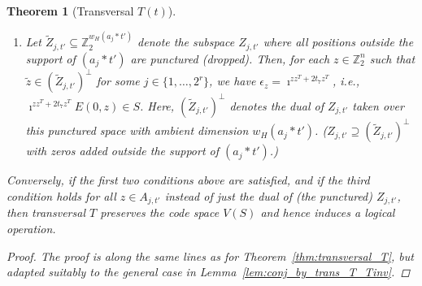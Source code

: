 \documentclass[twoside,romanappendices]{IEEEtran}
\newtheorem{theorem}{Theorem}
\newcommand{\llbr}{[\![}
\newcommand{\rrbr}{]\!]}
\begin{document}
\begin{theorem}[Transversal $T(t)$]
\begin{enumerate}
\item Let $\tilde{Z}_{j,t'} \subseteq \mathbb{Z}_2^{w_H(a_j \ast t')}$ denote the subspace $Z_{j,t'}$ where all positions outside the support of $(a_j \ast t')$ are punctured (dropped).
      Then, for each $z \in \mathbb{Z}_2^n$ such that $\tilde{z} \in (\tilde{Z}_{j,t'})^{\perp}$ for some $j \in \{ 1,\ldots,2^r \}$, we have $\epsilon_z = \imath^{zz^T + 2t_7 z^T}$, i.e., $\imath^{zz^T + 2t_7 z^T} E(0,z) \in S$.
      Here, $(\tilde{Z}_{j,t'})^{\perp}$ denotes the dual of $Z_{j,t'}$ taken over this punctured space with ambient dimension $w_H(a_j \ast t')$.
      ($Z_{j,t'} \supseteq (\tilde{Z}_{j,t'})^{\perp}$ with zeros added outside the support of $(a_j \ast t')$.)

\end{enumerate} 
Conversely, if the first two conditions above are satisfied, and if the third condition holds for all $z \in A_{j,t'}$ instead of just the dual of (the punctured) $Z_{j,t'}$, then transversal $T$ preserves the code space $V(S)$ and hence induces a logical operation.
\begin{proof}
The proof is along the same lines as for Theorem~\ref{thm:transversal_T}, but adapted suitably to the general case in Lemma~\ref{lem:conj_by_trans_T_Tinv}.
\end{proof}
\end{theorem}




      
\end{document}
